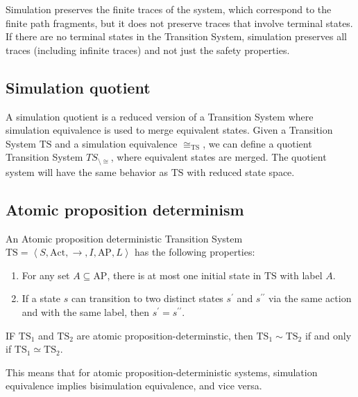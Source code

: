 Simulation preserves the finite traces of the system, which correspond to the finite path fragments, but it does not preserve traces that involve terminal states.
If there are no terminal states in the Transition System, simulation preserves all traces (including infinite traces) and not just the safety properties.

\subsection{Simulation quotient}
A simulation quotient is a reduced version of a Transition System where simulation equivalence is used to merge equivalent states.
Given a Transition System $\text{TS}$ and a simulation equivalence $\cong_{\text{TS}}$, we can define a quotient Transition System $TS_{\setminus\cong}$, where equivalent states are merged.
The quotient system will have the same behavior as $\text{TS}$ with reduced state space.

\subsection{Atomic proposition determinism}
\begin{definition}
    An Atomic proposition deterministic Transition System $\text{TS}=\left\langle S,\text{Act},\rightarrow,I,\text{AP},L\right\rangle$ has the following properties: 
    \begin{enumerate}
        \item For any set $A\subseteq\text{AP}$, there is at most one initial state in $\text{TS}$ with label $A$.
        \item If a state $s$ can transition to two distinct states $s^\prime$ and $s^{\prime\prime}$ via the same action and with the same label, then $s^\prime=s^{\prime\prime}$.
    \end{enumerate}
\end{definition}
\begin{theorem}
    IF $\text{TS}_1$ and $\text{TS}_2$ are atomic proposition-determinstic, then $\text{TS}_1\sim\text{TS}_2$ if and only if $\text{TS}_1\simeq\text{TS}_2$. 
\end{theorem}
\noindent This means that for atomic proposition-deterministic systems, simulation equivalence implies bisimulation equivalence, and vice versa.

